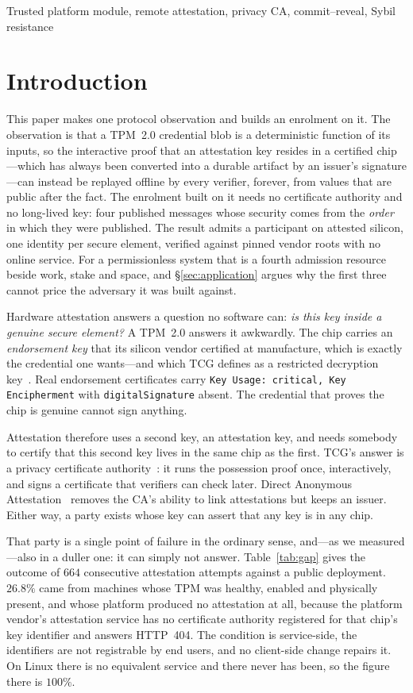 \documentclass[conference,10pt]{IEEEtran}
\begin{document}
\begin{IEEEkeywords}
Trusted platform module, remote attestation, privacy CA, commit--reveal, Sybil resistance
\end{IEEEkeywords}

\section{Introduction}

This paper makes one protocol observation and builds an enrolment on it. The observation is that a
TPM~2.0 credential blob is a deterministic function of its inputs, so the interactive proof that an
attestation key resides in a certified chip---which has always been converted into a durable artifact by
an issuer's signature---can instead be replayed offline by every verifier, forever, from values that are
public after the fact. The enrolment built on it needs no certificate authority and no long-lived key:
four published messages whose security comes from the \emph{order} in which they were published. The
result admits a participant on attested silicon, one identity per secure element, verified against
pinned vendor roots with no online service. For a permissionless system that is a fourth admission
resource beside work, stake and space, and \S\ref{sec:application} argues why the first three cannot
price the adversary it was built against.

Hardware attestation answers a question no software can: \emph{is this key inside a genuine secure
element?} A TPM~2.0 answers it awkwardly. The chip carries an \emph{endorsement key} that its silicon
vendor certified at manufacture, which is exactly the credential one wants---and which TCG defines as a
restricted decryption key~\cite{tcgek}. Real endorsement certificates carry \texttt{Key Usage:
critical, Key Encipherment} with \texttt{digitalSignature} absent. The credential that proves the chip
is genuine cannot sign anything.

Attestation therefore uses a second key, an attestation key, and needs somebody to certify that this
second key lives in the same chip as the first. TCG's answer is a privacy certificate
authority~\cite{tpm2}: it runs the possession proof once, interactively, and signs a certificate that
verifiers can check later. Direct Anonymous Attestation~\cite{daa} removes the CA's ability to link
attestations but keeps an issuer. Either way, a party exists whose key can assert that any key is in
any chip.

That party is a single point of failure in the ordinary sense, and---as we measured---also in a duller
one: it can simply not answer. Table~\ref{tab:gap} gives the outcome of $664$ consecutive attestation
attempts against a public deployment. $26.8\%$ came from machines whose TPM was healthy, enabled and
physically present, and whose platform produced no attestation at all, because the platform vendor's
attestation service has no certificate authority registered for that chip's key identifier and answers
HTTP~404. The condition is service-side, the identifiers are not registrable by end users, and no
client-side change repairs it. On Linux there is no equivalent service and there never has been, so
the figure there is $100\%$.
\end{document}
